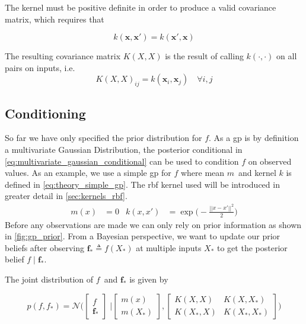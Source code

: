 The kernel must be positive definite in order to produce a valid covariance matrix, which requires that

\begin{equation}
    k(\boldsymbol{x}, \boldsymbol{x}') = k(\boldsymbol{x}', \boldsymbol{x})
\end{equation}

The resulting covariance matrix $K(X, X)$ is the result of calling $k(\cdot, \cdot)$ on all pairs on inputs, i.e.
\begin{equation}
    K(X, X)_{ij} = k(\boldsymbol{x}_i, \boldsymbol{x}_j) \quad \forall i, j
\end{equation}

\subsection{Conditioning}
So far we have only specified the prior distribution for $f$. As a \acrshort{gp} is by definition a multivariate Gaussian Distribution, the posterior conditional in \cref{eq:multivariate_gaussian_conditional} can be used to condition $f$ on observed values. 
As an example, we use a simple \acrshort{gp} for $f$ where mean $m$ and kernel $k$ is defined in \cref{eq:theory_simple_gp}. The \acrshort{rbf} kernel used will be introduced in greater detail in \cref{sec:kernels_rbf}.
\begin{align}\label{eq:theory_simple_gp}
    m(x) &= 0 & k(x, x') &= \exp\bigg(-\frac{|| x - x'||^2}{2}\bigg)
\end{align}
Before any observations are made we can only rely on prior information as shown in \cref{fig:gp_prior}. From a Bayesian perspective, we want to update our prior beliefs after observing $\boldsymbol{f}_* \triangleq f(X_*)$ at multiple inputs $X_*$ to get the posterior belief $f \; | \; \boldsymbol{f}_*$.

The joint distribution of $f$ and $\boldsymbol{f}_*$ is given by 

\begin{equation}
    p(f, f_*) = \mathcal{N}\bigg(\begin{bmatrix}
        f \\ \boldsymbol{f}_*
    \end{bmatrix} \; \bigg| \begin{bmatrix}
        m(x) \\ m(X_*)
    \end{bmatrix},  \begin{bmatrix}
        K(X, X) & K(X, X_*) \\ K(X_*, X) & K(X_*, X_*)
    \end{bmatrix}\bigg)
\end{equation}

